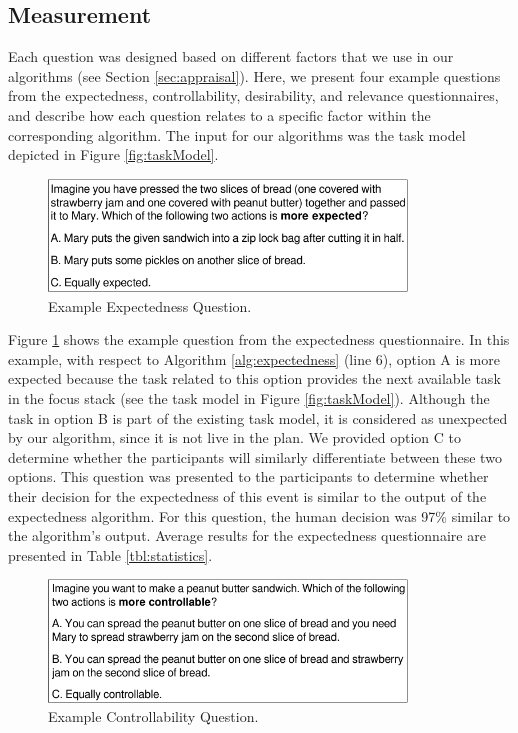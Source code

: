 \documentclass[12pt]{report}
\begin{document}
\subsection{Measurement}
Each question was designed based on different factors that we use in our
algorithms (see Section \ref{sec:appraisal}). Here, we present four example
questions from the expectedness, controllability, desirability, and relevance
questionnaires, and describe how each question relates to a specific factor
within the corresponding algorithm. The input for our algorithms was the task
model depicted in Figure \ref{fig:taskModel}.

\begin{figure}[tbh]
  \centering
  \includegraphics[width=0.85\textwidth]{figure/question-sample-croped.pdf}
  \caption{{\fontsize{9}{9}\selectfont Example Expectedness Question.}}
  \label{fig:qs1}
  \vspace{-5mm}
\end{figure}

Figure \ref{fig:qs1} shows the example question from the expectedness
questionnaire. In this example, with respect to Algorithm
\ref{alg:expectedness} (line 6), option A is more expected because the task
related to this option provides the next available task in the focus stack (see
the task model in Figure \ref{fig:taskModel}). Although the task in option B is
part of the existing task model, it is considered as unexpected by our
algorithm, since it is not live in the plan. We provided option C to determine
whether the participants will similarly differentiate between these two
options. This question was presented to the participants to determine whether
their decision for the expectedness of this event is similar to the output of
the expectedness algorithm. For this question, the human decision was 97\%
similar to the algorithm's output. Average results for the expectedness
questionnaire are presented in Table \ref{tbl:statistics}.

\begin{figure}[tbh]
  \centering
  \includegraphics[width=0.85\textwidth]{figure/question-sample2-croped.pdf}
  \caption{{\fontsize{9}{9}\selectfont Example Controllability Question.}}
  \label{fig:qs2}
  \vspace{-5mm}
\end{figure}
\end{document}
